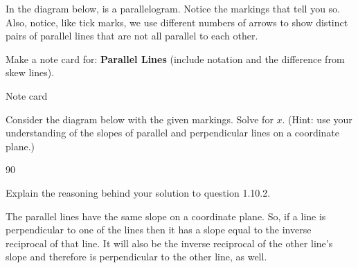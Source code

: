 In the diagram below,  is a parallelogram. 
Notice the markings that tell you so.  Also, notice, like tick marks, we use different numbers of arrows to show distinct pairs of parallel lines that are not all parallel to each other.  
	\begin{center}
	\end{center}
\begin{exercises}

\begin{ex}
	\e Make a note card for:  \textbf{Parallel Lines} (include notation and the difference from skew lines).  
	\begin{sol}
	Note card
	\end{sol}
\end{ex}

\begin{ex}  \e Consider the diagram below with the given markings.  Solve for $x$.  (Hint: use your understanding of the slopes of parallel and perpendicular lines on a coordinate plane.)
\begin{sol}
90\degree
\end{sol}
\end{ex}


\begin{ex}  \e Explain the reasoning behind your solution to question 1.10.2.
\bigskip
\begin{sol}
The parallel lines have the same slope on a coordinate plane.  So, if a line is perpendicular to one of the lines then it has a slope equal to the inverse reciprocal of that line.  It will also be the inverse reciprocal of the other line's slope and therefore is perpendicular to the other line, as well.
\end{sol}
\end{ex}


\end{exercises}
